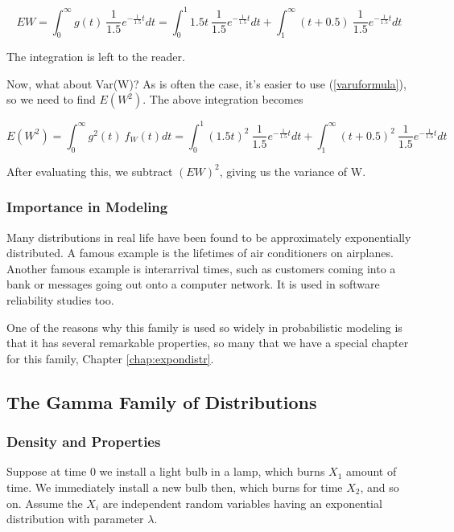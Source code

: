 \begin{equation}
EW = \int_{0}^{\infty} g(t) ~ \frac{1}{1.5} e^{-\frac{1}{1.5}t} dt
= \int_{0}^{1} 1.5 t ~ \frac{1}{1.5} e^{-\frac{1}{1.5}t} dt +
\int_{1}^{\infty} (t+0.5) ~ \frac{1}{1.5} e^{-\frac{1}{1.5}t} dt
\end{equation}

The integration is left to the reader.

Now, what about Var(W)?  As is often the case, it's easier to use
(\ref{varuformula}), so we need to find $E(W^2)$.  The above integration
becomes

\begin{equation}
E(W^2) 
= \int_{0}^{\infty} g^2(t) ~ f_W (t) dt
= \int_{0}^{1} (1.5 t)^2 ~ \frac{1}{1.5} e^{-\frac{1}{1.5}t} dt +
  \int_{1}^{\infty} (t+0.5)^2 ~ \frac{1}{1.5} e^{-\frac{1}{1.5}t} dt
\end{equation}

After evaluating this, we subtract $(EW)^2$, giving us the variance of
W.

\subsubsection{Importance in Modeling}

Many distributions in real life have been found to be approximately
exponentially distributed.  A famous example is the lifetimes of air
conditioners on airplanes.  Another famous example is interarrival
times, such as customers coming into a bank or messages going out onto a
computer network.  It is used in software reliability studies too.

One of the reasons why this family is used so widely in probabilistic
modeling is that it has several remarkable properties, so many that we
have a special chapter for this family, Chapter \ref{chap:expondistr}.

\subsection{The Gamma Family of Distributions}
\label{gammafam}

\subsubsection{Density and Properties}
\label{gammaprops}

Suppose at time 0 we install a light bulb in a lamp, which burns $X_1$
amount of time.  We immediately install a new bulb then, which burns for
time $X_2$, and so on.  Assume the $X_i$ are independent random
variables having an exponential distribution with parameter $\lambda$.

